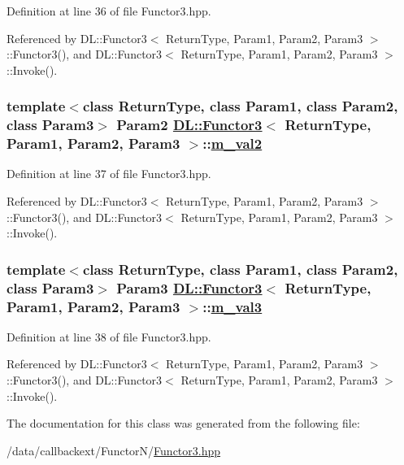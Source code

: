 Definition at line 36 of file Functor3.hpp.

Referenced by DL::Functor3$<$ Return\-Type, Param1, Param2, Param3 $>$::Functor3(), and DL::Functor3$<$ Return\-Type, Param1, Param2, Param3 $>$::Invoke().\hypertarget{classDL_1_1Functor3_r2}{
\subsubsection[m\_\-val2]{\setlength{\rightskip}{0pt plus 5cm}template$<$class Return\-Type, class Param1, class Param2, class Param3$>$ Param2 \hyperlink{classDL_1_1Functor3}{DL::Functor3}$<$ Return\-Type, Param1, Param2, Param3 $>$::\hyperlink{classDL_1_1Functor3_r2}{m\_\-val2}}}
\label{classDL_1_1Functor3_r2}




Definition at line 37 of file Functor3.hpp.

Referenced by DL::Functor3$<$ Return\-Type, Param1, Param2, Param3 $>$::Functor3(), and DL::Functor3$<$ Return\-Type, Param1, Param2, Param3 $>$::Invoke().\hypertarget{classDL_1_1Functor3_r3}{
\subsubsection[m\_\-val3]{\setlength{\rightskip}{0pt plus 5cm}template$<$class Return\-Type, class Param1, class Param2, class Param3$>$ Param3 \hyperlink{classDL_1_1Functor3}{DL::Functor3}$<$ Return\-Type, Param1, Param2, Param3 $>$::\hyperlink{classDL_1_1Functor3_r3}{m\_\-val3}}}
\label{classDL_1_1Functor3_r3}




Definition at line 38 of file Functor3.hpp.

Referenced by DL::Functor3$<$ Return\-Type, Param1, Param2, Param3 $>$::Functor3(), and DL::Functor3$<$ Return\-Type, Param1, Param2, Param3 $>$::Invoke().

The documentation for this class was generated from the following file:\begin{CompactItemize}
\item 
/data/callbackext/Functor\-N/\hyperlink{Functor3_8hpp}{Functor3.hpp}\end{CompactItemize}
